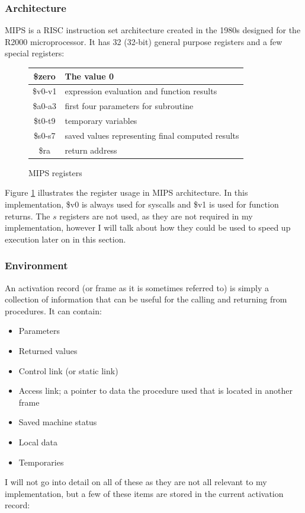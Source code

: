 \documentclass[12pt]{article}
\begin{document}
\subsubsection{Architecture}
MIPS is a RISC instruction set architecture created in the 1980s\supercite{price1995mips} designed for the R2000 microprocessor. It has 32 (32-bit) general purpose registers and a few special registers:
\begin{figure}[H]
  \begin{tabular}{c|l}
    \$zero & The value 0 \\\hline
    \$v0-v1 & expression evaluation and function results \\\hline
    \$a0-a3 & first four parameters for subroutine \\\hline 
    \$t0-t9 & temporary variables \\\hline 
    \$s0-s7 & saved values representing final computed results \\\hline 
    \$ra & return address
  \end{tabular}
  \caption{MIPS registers}
  \label{reg}
\end{figure}
Figure \ref{reg} illustrates the register usage in MIPS architecture. In this implementation, \$v0 is always used for syscalls and \$v1 is used for function returns. The $s$ registers are not used, as they are not required in my implementation, however I will talk about how they could be used to speed up execution later on in this section.
\subsubsection{Environment}
An activation record (or frame as it is sometimes referred to) is simply a collection of information that can be useful for the calling and returning from procedures. It can contain\supercite{compilers}: 
\begin{itemize}
  \item Parameters
  \item Returned values
  \item Control link (or static link)
  \item Access link; a pointer to data the procedure used that is located in another frame
  \item Saved machine status
  \item Local data
  \item Temporaries 
\end{itemize}
I will not go into detail on all of these as they are not all relevant to my implementation, but a few of these items are stored in the current activation record: 
\end{document}
